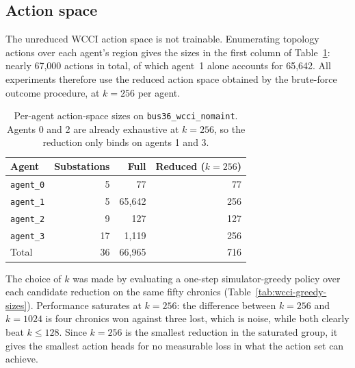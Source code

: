 \subsection{Action space}
\label{sec:wcci-action-space}

The unreduced WCCI action space is not trainable. Enumerating topology actions over each agent's region gives the sizes in
the first column of Table~\ref{tab:wcci-action-space}: nearly 67{,}000 actions in
total, of which agent~1 alone accounts for 65{,}642. All experiments therefore
use the reduced action space obtained by the brute-force outcome procedure, at
$k=256$ per agent.

\begin{table}[H]
  \centering
  \small
  \caption{Per-agent action-space sizes on \texttt{bus36\_wcci\_nomaint}. Agents
  0 and 2 are already exhaustive at $k=256$, so the reduction only binds on
  agents 1 and 3.}
  \label{tab:wcci-action-space}
  \setlength{\tabcolsep}{8pt}
  \begin{tabular}{lrrr}
    \toprule
    Agent & Substations & Full & Reduced ($k=256$) \\
    \midrule
    \texttt{agent\_0} & 5  & 77     & 77  \\
    \texttt{agent\_1} & 5  & 65{,}642 & 256 \\
    \texttt{agent\_2} & 9  & 127    & 127 \\
    \texttt{agent\_3} & 17 & 1{,}119  & 256 \\
    \midrule
    Total             & 36 & 66{,}965 & 716 \\
    \bottomrule
  \end{tabular}
\end{table}

\noindent The choice of $k$ was made by evaluating a one-step simulator-greedy policy over
each candidate reduction on the same fifty chronics
(Table~\ref{tab:wcci-greedy-sizes}). Performance saturates at $k=256$: the
difference between $k=256$ and $k=1024$ is four chronics won against three lost,
which is noise, while both clearly beat $k \le 128$. Since $k=256$ is the
smallest reduction in the saturated group, it gives the smallest action heads
for no measurable loss in what the action set can achieve.

